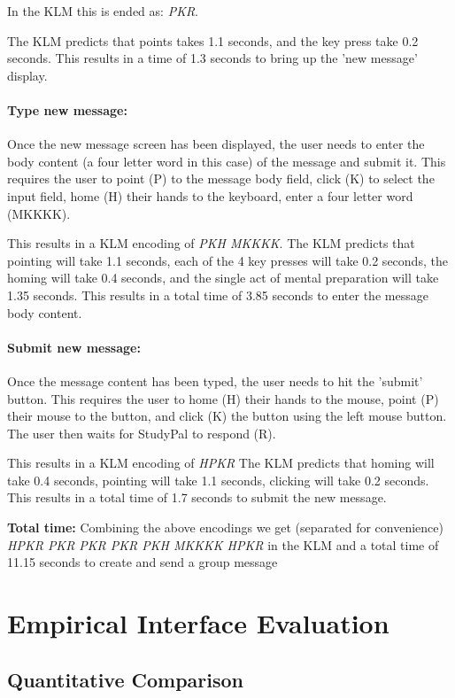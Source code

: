 \documentclass[conference]{IEEEtran}
\begin{document}
In the KLM this is ended as: \emph{PKR}.

The KLM predicts that points takes 1.1 seconds, and the key press take 0.2 seconds.
This results in a time of 1.3 seconds to bring up the 'new message' display.

\paragraph{Type new message:}
Once the new message screen has been displayed, the user needs to enter the body content (a four letter word in this case) of the message and submit it.  This requires the user to point (P) to the message body field, click (K) to select the input field, home (H) their hands to the keyboard, enter a four letter word (MKKKK).

This results in a KLM encoding of \emph{PKH MKKKK}.
The KLM predicts that pointing will take 1.1 seconds, each of the 4 key presses will take 0.2 seconds, the homing will take 0.4 seconds, and the single act of mental preparation will take 1.35 seconds.
This results in a total time of 3.85 seconds to enter the message body content.

\paragraph{Submit new message:}
Once the message content has been typed, the user needs to hit the 'submit' button.  This requires the user to home (H) their hands to the mouse, point (P) their mouse to the button, and click (K) the button using the left mouse button. The user then waits for StudyPal to respond (R).

This results in a KLM encoding of \emph{HPKR}
The KLM predicts that homing will take 0.4 seconds, pointing will take 1.1 seconds, clicking will take 0.2 seconds. 
This results in a total time of 1.7 seconds to submit the new message.

\textbf{Total time:}
Combining the above encodings we get (separated for convenience) \emph{HPKR PKR PKR PKR PKH MKKKK HPKR} in the KLM and a total time of 11.15 seconds to create and send a group message



\section{Empirical Interface Evaluation}

\subsection{Quantitative Comparison}
\end{document}
